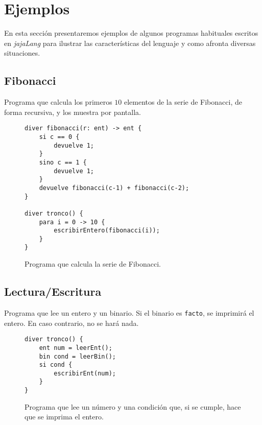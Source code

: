 \section{Ejemplos}
En esta sección presentaremos ejemplos de algunos programas habituales escritos
en \textit{jajaLang} para ilustrar las características del lenguaje y como
afronta diversas situaciones.

\subsection{Fibonacci}
Programa que calcula los primeros $10$ elementos de la serie de Fibonacci, de forma
recursiva, y los muestra por pantalla.
\begin{figure}[htbp]
    \centering
    \begin{lstlisting}
diver fibonacci(r: ent) -> ent {
    si c == 0 {
        devuelve 1; 
    }
    sino c == 1 {
        devuelve 1;
    }
    devuelve fibonacci(c-1) + fibonacci(c-2);
}

diver tronco() {
    para i = 0 -> 10 {
        escribirEntero(fibonacci(i));
    } 
}
    \end{lstlisting}
    \caption{Programa que calcula la serie de Fibonacci.}
\end{figure}

\subsection{Lectura/Escritura}
Programa que lee un entero y un binario. Si el binario es \lstinline{facto}, se
imprimirá el entero. En caso contrario, no se hará nada.
\begin{figure}[htbp]
    \centering
    \begin{lstlisting}
diver tronco() {
    ent num = leerEnt();
    bin cond = leerBin();
    si cond {
        escribirEnt(num);
    }
}
    \end{lstlisting}
    \caption{Programa que lee un número y una condición que, si se cumple, hace
    que se imprima el entero.}
\end{figure}

